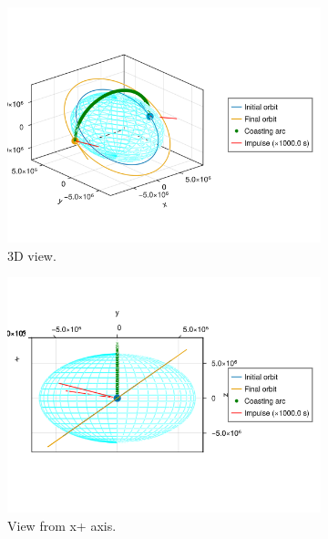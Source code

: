 \begin{figure}[htbp]
    \centering
    \begin{subfigure}{0.49\linewidth}
        \includegraphics[width=\linewidth]{../results/j2/hohmann/ICI_3d.png}
        \caption{3D view.}
    \end{subfigure}
    \begin{subfigure}{0.49\linewidth}
        \includegraphics[width=\linewidth]{../results/j2/hohmann/ICI_x+.png}
        \caption{View from x+ axis.}
    \end{subfigure}
    \begin{subfigure}{0.49\linewidth}

\end{subfigure}
\end{figure}
